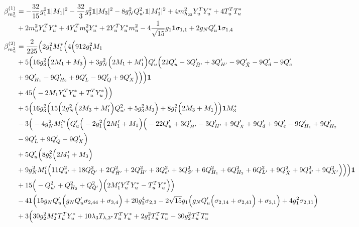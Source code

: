 {\begin{align}
\beta_{m_u^2}^{(1)} & =  
-\frac{32}{15} g_{1}^{2} {\bf 1} |M_1|^2 -\frac{32}{3} g_{3}^{2} {\bf 1} |M_3|^2 -8 g_{N}^{2} Q_{u'}^{2} {\bf 1} |M_1'|^2 +4 m_{h_{23}}^2 {Y_{u}^{T}  Y_u^*} +4 {T_{u}^{T}  T_u^*} \nonumber \\ 
 &+2 {m_u^2  Y_{u}^{T}  Y_u^*} +4 {Y_{u}^{T}  m_q^2  Y_u^*} +2 {Y_{u}^{T}  Y_u^*  m_u^2} -4 \frac{1}{\sqrt{15}} g_1 {\bf 1} \sigma_{1,1} +2 g_N Q_u' {\bf 1} \sigma_{1,4} \\ 
\beta_{m_u^2}^{(2)} & =  
\frac{2}{225} \Big(2 g_{1}^{2} M_1^* \Big(4 \Big(912 g_{1}^{2} M_1 \nonumber \\ 
 &+5 \Big(16 g_{3}^{2} \Big(2 M_1  + M_3\Big) + 3 g_{N}^{2} \Big(2 M_1  + M_1'\Big)Q_u' \Big(22 Q_u'  -3 Q_{\bar{H}'}'  + 3 Q_{H'}'  -9 Q_{\bar{X}}'  -9 Q_d'  -9 Q_e' \nonumber\\
& + 9 Q_{H_1}'  -9 Q_{H_2}'  + 9 Q_L'  -9 Q_Q'  + 9 Q_X' \Big)\Big)\Big){\bf 1} \nonumber \\ 
 &+45 \Big(-2 M_1 {Y_{u}^{T}  Y_u^*}  + {T_{u}^{T}  Y_u^*}\Big)\Big)\nonumber \\ 
 &+5 \Big(16 g_{3}^{2} \Big(15 \Big(2 g_{N}^{2} \Big(2 M_3  + M_1'\Big)Q_{u'}^{2}  + 5 g_{3}^{2} M_3 \Big) + 8 g_{1}^{2} \Big(2 M_3  + M_1\Big)\Big){\bf 1} M_3^* \nonumber \\ 
 &-3 \Big(-4 g_{N}^{2} M_1'^* \Big(Q_u' \Big(-2 g_{1}^{2} \Big(2 M_1'  + M_1\Big)\Big(-22 Q_u'  + 3 Q_{\bar{H}'}'  -3 Q_{H'}'  + 9 Q_{\bar{X}}'  + 9 Q_d'  + 9 Q_e'  -9 Q_{H_1}'  + 9 Q_{H_2}' \nonumber\\
& -9 Q_L'  + 9 Q_Q'  -9 Q_X' \Big)\nonumber \\ 
 &+5 Q_u' \Big(8 g_{3}^{2} \Big(2 M_1'  + M_3\Big)\nonumber \\ 
 &+9 g_{N}^{2} M_1' \Big(11 Q_{u'}^{2}  + 18 Q_{Q'}^{2}  + 2 Q_{\bar{H}'}^{2}  + 2 Q_{H'}^{2}  + 3 Q_{e'}^{2}  + 3 Q_{S'}^{2}  + 6 Q_{H_1}^{2}  + 6 Q_{H_2}^{2}  + 6 Q_{L'}^{2}  + 9 Q_{\bar{X}}^{2}  + 9 Q_{d'}^{2}  + 9 Q_{X'}^{2} \Big)\Big)\Big){\bf 1} \nonumber \\ 
 &+15 \Big(- Q_{u'}^{2}  + Q_{H_2}^{2} + Q_{Q'}^{2}\Big)\Big(2 M_1' {Y_{u}^{T}  Y_u^*}  - {T_{u}^{T}  Y_u^*} \Big)\Big)\nonumber \\ 
 &-4 {\bf 1} \Big(15 g_N Q_u' \Big(g_N Q_u' \sigma_{2,44}  + \sigma_{3,4}\Big) + 20 g_{3}^{4} \sigma_{2,3}  -2 \sqrt{15} g_1 \Big(g_N Q_u' \Big(\sigma_{2,14} + \sigma_{2,41}\Big) + \sigma_{3,1}\Big) + 4 g_{1}^{2} \sigma_{2,11} \Big)\nonumber \\ 
 &+3 \Big(30 g_{2}^{2} M_2^* {T_{u}^{T}  Y_u^*} +10 \lambda_3 T_{{\lambda,3}^*} {T_{u}^{T}  Y_u^*} +2 g_{1}^{2} {T_{u}^{T}  T_u^*} -30 g_{2}^{2} {T_{u}^{T}  T_u^*} \nonumber \\ 

\end{align}}
